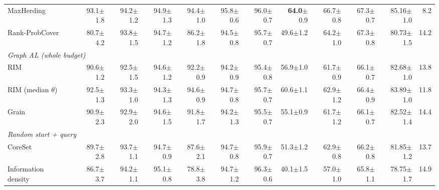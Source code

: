 \begin{table}[t]
\begin{adjustbox}{max width=\textwidth}
\begin{tabular}{lrrrrrrrrrrr}
\quad MaxHerding~\cite{bae2024generalized} & 93.1{\scriptsize$\pm$1.8} & 94.2{\scriptsize$\pm$1.2} & 94.9{\scriptsize$\pm$1.3} & 94.4{\scriptsize$\pm$1.0} & 95.8{\scriptsize$\pm$0.6} & 96.0{\scriptsize$\pm$0.7} & \textbf{64.0}{\scriptsize$\pm$0.9} & 66.7{\scriptsize$\pm$0.8} & 67.3{\scriptsize$\pm$0.7} & 85.16{\scriptsize$\pm$1.0} & 8.2 \\
\quad Rank-ProbCover & 80.7{\scriptsize$\pm$4.2} & 93.8{\scriptsize$\pm$1.5} & 94.7{\scriptsize$\pm$1.2} & 86.2{\scriptsize$\pm$1.8} & 94.5{\scriptsize$\pm$0.8} & 95.7{\scriptsize$\pm$0.7} & 49.6{\scriptsize$\pm$1.2} & 64.2{\scriptsize$\pm$1.0} & 67.3{\scriptsize$\pm$0.8} & 80.73{\scriptsize$\pm$1.5} & 14.2 \\
\multicolumn{12}{l}{\textit{Graph AL (whole budget)}} \\
\quad RIM~\cite{zhang2021rim} & 90.6{\scriptsize$\pm$1.2} & 92.5{\scriptsize$\pm$1.5} & 94.6{\scriptsize$\pm$1.2} & 92.2{\scriptsize$\pm$0.9} & 94.2{\scriptsize$\pm$0.9} & 95.4{\scriptsize$\pm$0.8} & 56.9{\scriptsize$\pm$1.0} & 61.7{\scriptsize$\pm$0.9} & 66.1{\scriptsize$\pm$0.7} & 82.68{\scriptsize$\pm$1.0} & 13.8 \\
\quad RIM (median $\theta$)~\cite{zhang2021rim} & 92.5{\scriptsize$\pm$1.3} & 93.3{\scriptsize$\pm$1.0} & 94.3{\scriptsize$\pm$1.3} & 94.6{\scriptsize$\pm$0.9} & 94.7{\scriptsize$\pm$0.8} & 95.7{\scriptsize$\pm$0.7} & 60.6{\scriptsize$\pm$1.1} & 62.9{\scriptsize$\pm$1.2} & 66.4{\scriptsize$\pm$0.9} & 83.89{\scriptsize$\pm$1.0} & 11.8 \\
\quad Grain~\cite{zhang2021grain} & 90.9{\scriptsize$\pm$2.3} & 92.9{\scriptsize$\pm$2.0} & 94.6{\scriptsize$\pm$1.5} & 91.8{\scriptsize$\pm$1.7} & 94.2{\scriptsize$\pm$1.3} & 95.5{\scriptsize$\pm$0.7} & 55.1{\scriptsize$\pm$0.9} & 61.7{\scriptsize$\pm$1.2} & 66.1{\scriptsize$\pm$0.7} & 82.52{\scriptsize$\pm$1.4} & 14.4 \\
\multicolumn{12}{l}{\textit{Random start + query}} \\
\quad CoreSet~\cite{sener2017active} & 89.7{\scriptsize$\pm$2.8} & 93.7{\scriptsize$\pm$1.1} & 94.7{\scriptsize$\pm$0.9} & 87.6{\scriptsize$\pm$2.1} & 94.7{\scriptsize$\pm$0.8} & 95.9{\scriptsize$\pm$0.7} & 51.3{\scriptsize$\pm$1.2} & 62.9{\scriptsize$\pm$0.8} & 66.2{\scriptsize$\pm$0.8} & 81.85{\scriptsize$\pm$1.2} & 13.7 \\
\quad Information density~\cite{settles2008analysis} & 86.7{\scriptsize$\pm$3.7} & 94.2{\scriptsize$\pm$1.1} & 95.1{\scriptsize$\pm$0.8} & 78.8{\scriptsize$\pm$3.8} & 94.7{\scriptsize$\pm$1.2} & 96.3{\scriptsize$\pm$0.6} & 40.1{\scriptsize$\pm$1.5} & 57.0{\scriptsize$\pm$1.0} & 65.8{\scriptsize$\pm$1.1} & 78.75{\scriptsize$\pm$1.7} & 14.9 \\

\end{tabular}
\end{adjustbox}
\end{table}
